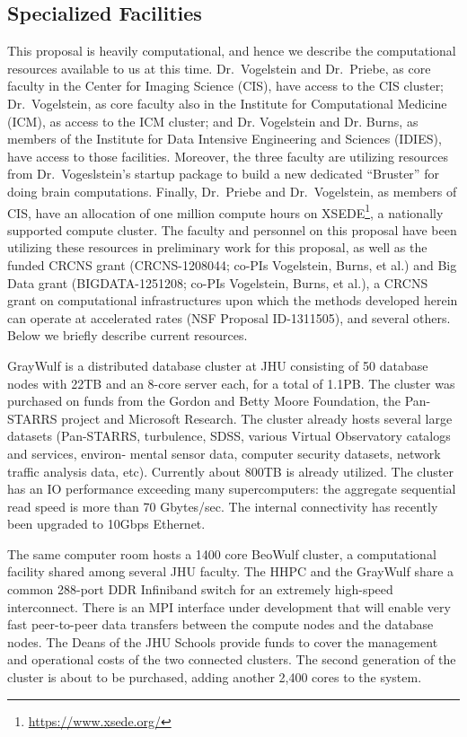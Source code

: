 \subsection[ Specialized Facilities]{Specialized Facilities}


This proposal is heavily computational, and hence we describe the computational resources available to us at this time.  Dr.~Vogelstein and Dr.~Priebe, as core faculty in the Center for Imaging Science (CIS), have access to the CIS cluster; Dr.~Vogelstein, as core faculty also in the Institute for Computational Medicine (ICM), as access to the ICM cluster; and Dr. Vogelstein and Dr. Burns, as members of the Institute for Data Intensive Engineering and Sciences (IDIES), have access to those facilities.  Moreover, the three faculty are utilizing resources from Dr.~Vogeslstein's startup package to build a new dedicated ``Bruster'' for doing brain computations.  Finally, Dr.~Priebe and Dr.~Vogelstein, as members of CIS, have an allocation of one million compute hours on XSEDE\footnote{\url{https://www.xsede.org/}}, a nationally supported compute cluster.  The faculty and personnel on this proposal have been utilizing these resources  in preliminary work for this proposal, as well as the funded CRCNS grant (CRCNS-1208044; co-PIs Vogelstein, Burns, et al.) and Big Data grant (BIGDATA-1251208; co-PIs Vogelstein, Burns, et al.),  a CRCNS grant on computational infrastructures upon which the methods developed herein can operate at accelerated rates (NSF Proposal ID-1311505), and several others.  Below we briefly describe current resources.




GrayWulf is a distributed database cluster at JHU consisting of 50 database nodes with 22TB and an 8-core server each, for a total of 1.1PB. The cluster was purchased on funds from the Gordon and Betty Moore Foundation, the Pan-STARRS project and Microsoft Research. The cluster already hosts several large datasets (Pan-STARRS, turbulence, SDSS, various Virtual Observatory catalogs and services, environ- mental sensor data, computer security datasets, network traffic analysis data, etc). Currently about 800TB is already utilized. The cluster has an IO performance exceeding many supercomputers: the aggregate sequential read speed is more than 70 Gbytes/sec. The internal connectivity has recently been upgraded to 10Gbps Ethernet.

% 
The same computer room hosts a 1400 core BeoWulf cluster, a computational facility shared among several JHU faculty.  The HHPC and the GrayWulf share a common 288-port DDR Infiniband switch for an extremely high-speed interconnect. There is an MPI interface under development that will enable very fast peer-to-peer data transfers between the compute nodes and the database nodes. The Deans of the JHU Schools provide funds to cover the management and operational costs of the two connected clusters. The second generation of the cluster is about to be purchased, adding another 2,400 cores to the system.



